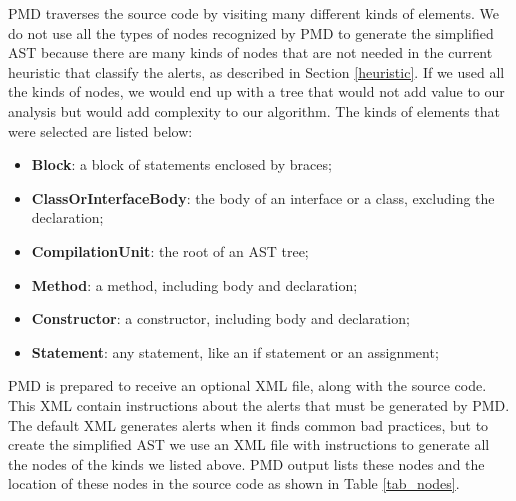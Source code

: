 \documentclass[
]{article}
\begin{document}
PMD traverses the source code by visiting many different kinds of
elements. We do not use all the types of nodes recognized by PMD to
generate the simplified AST because there are many kinds of nodes that
are not needed in the current heuristic that classify the alerts, as
described in Section \ref{heuristic}. If we used all the kinds of nodes,
we would end up with a tree that would not add value to our analysis but
would add complexity to our algorithm. The kinds of elements that were
selected are listed below:

\begin{itemize}


\item \textbf{Block}: a block of statements enclosed by braces;

\item \textbf{ClassOrInterfaceBody}: the body of an interface or a class, excluding the declaration;

\item \textbf{CompilationUnit}: the root of an AST tree;

\item \textbf{Method}: a method, including body and declaration;

\item \textbf{Constructor}: a constructor, including body and declaration;

\item \textbf{Statement}: any statement, like an if statement or an assignment;

\end{itemize}

PMD is prepared to receive an optional XML file, along with the source
code. This XML contain instructions about the alerts that must be
generated by PMD. The default XML generates alerts when it finds common
bad practices, but to create the simplified AST we use an XML file with
instructions to generate all the nodes of the kinds we listed above. PMD
output lists these nodes and the location of these nodes in the source
code as shown in Table \ref{tab_nodes}.

\small
\end{document}
